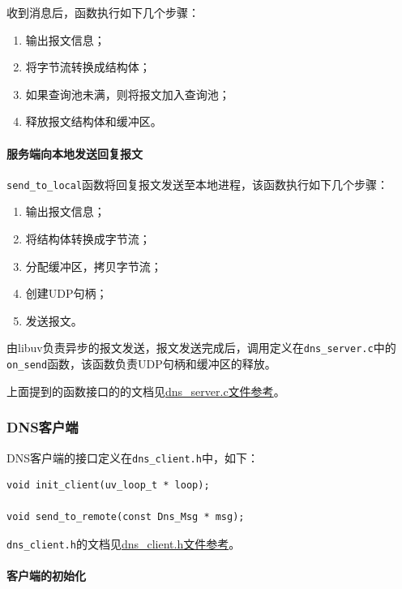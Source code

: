 \documentclass[lang=cn,11pt,a4paper,cite=authornum]{paper}
\begin{document}
收到消息后，函数执行如下几个步骤：

\begin{enumerate}
    \item 输出报文信息；
    \item 将字节流转换成结构体；
    \item 如果查询池未满，则将报文加入查询池；
    \item 释放报文结构体和缓冲区。
\end{enumerate}

\paragraph{服务端向本地发送回复报文}

\texttt{send_to_local}函数将回复报文发送至本地进程，该函数执行如下几个步骤：

\begin{enumerate}
    \item 输出报文信息；
    \item 将结构体转换成字节流；
    \item 分配缓冲区，拷贝字节流；
    \item 创建UDP句柄；
    \item 发送报文。
\end{enumerate}

由libuv负责异步的报文发送，报文发送完成后，调用定义在\texttt{dns_server.c}中的\texttt{on_send}函数，该函数负责UDP句柄和缓冲区的释放。

上面提到的函数接口的的文档见\href{run:./APIdoc/dns__server_8c.html}{dns\_server.c文件参考}。

\subsubsection{DNS客户端}

DNS客户端的接口定义在\texttt{dns_client.h}中，如下：

\begin{code}
\begin{verbatim}
void init_client(uv_loop_t * loop);

void send_to_remote(const Dns_Msg * msg);
\end{verbatim}
\end{code}

\texttt{dns_client.h}的文档见\href{run:./APIdoc/dns__client_8h.html}{dns\_client.h文件参考}。

\paragraph{客户端的初始化}
\end{document}
